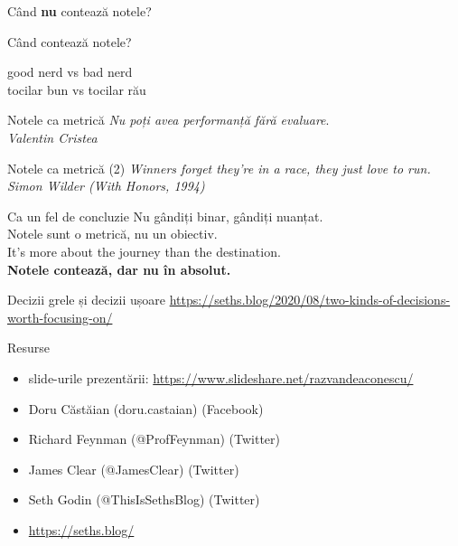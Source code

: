 \documentclass{simple}
\begin{document}
\begin{frame}{}
  \centering
  \Large
  Când \textbf{nu} contează notele?
\end{frame}

\begin{frame}{}
  \centering
  \Large
  Când contează notele?
\end{frame}

\begin{frame}{}
  \pause
  \centering
  \Large
  good nerd vs bad nerd \\
  \pause
  \vspace{3mm}
  tocilar bun vs tocilar rău
\end{frame}

\begin{frame}{Notele ca metrică}
  \textit{Nu poți avea performanță fără evaluare}. \\
  \vspace{3mm}
  \hfill \textit{Valentin Cristea}
\end{frame}

\begin{frame}{Notele ca metrică (2)}
  \textit{Winners forget they're in a race, they just love to run.} \\
  \vspace{3mm}
  \hfill \textit{Simon Wilder (With Honors, 1994)}
\end{frame}

\begin{frame}{Ca un fel de concluzie}
  \centering
  \pause
  Nu gândiți binar, gândiți nuanțat. \\
  \vspace{3mm}
  \pause
  Notele sunt o metrică, nu un obiectiv. \\
  \vspace{3mm}
  \pause
  It's more about the journey than the destination. \\
  \vspace{3mm}
  \pause
  \textbf{Notele contează, dar nu în absolut.}
\end{frame}

\begin{frame}{Decizii grele și decizii ușoare}
  \scriptsize
  \url{https://seths.blog/2020/08/two-kinds-of-decisions-worth-focusing-on/}
\end{frame}

\begin{frame}{Resurse}
  \begin{itemize}
    \item slide-urile prezentării: \url{https://www.slideshare.net/razvandeaconescu/}
    \item Doru Căstăian (doru.castaian) (Facebook)
    \item Richard Feynman (@ProfFeynman) (Twitter)
    \item James Clear (@JamesClear) (Twitter)
    \item Seth Godin (@ThisIsSethsBlog) (Twitter)
    \item \url{https://seths.blog/}
  \end{itemize}
\end{frame}
\end{document}
